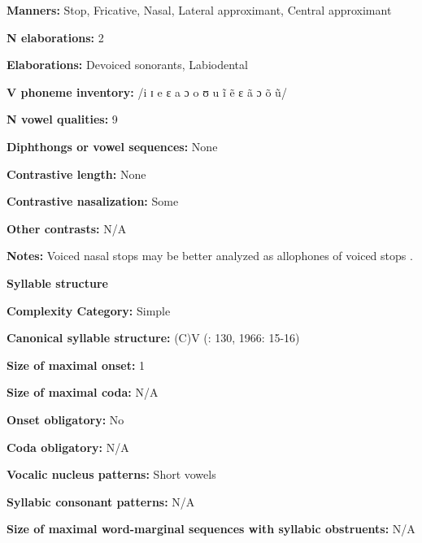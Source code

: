 \textbf{Manners:} Stop, Fricative, Nasal, Lateral approximant, Central approximant



\textbf{N elaborations:} 2



\textbf{Elaborations:} Devoiced sonorants, Labiodental



\textbf{V phoneme inventory:} /i ɪ e ɛ a ɔ o ʊ u ĩ ẽ ɛ ã ɔ õ ũ/



\textbf{N vowel qualities:} 9



\textbf{Diphthongs or vowel sequences:} None



\textbf{Contrastive length:} None



\textbf{Contrastive nasalization:} Some



\textbf{Other contrasts:} N/A



\textbf{Notes:} Voiced nasal stops may be better analyzed as allophones of voiced stops \citep[176]{Newman1986}.



\textbf{Syllable structure}



\textbf{Complexity Category:} Simple



\textbf{Canonical syllable structure:} (C)V (\citealt{Innes1981}: 130, 1966: 15-16)



\textbf{Size of maximal onset:} 1



\textbf{Size of maximal coda:} N/A



\textbf{Onset obligatory:} No



\textbf{Coda obligatory:} N/A



\textbf{Vocalic nucleus patterns:} Short vowels



\textbf{Syllabic consonant patterns:} N/A



\textbf{Size of maximal word{}-marginal sequences with syllabic obstruents:} N/A




